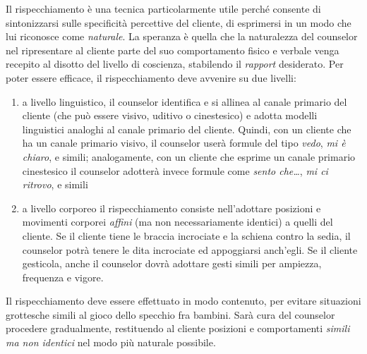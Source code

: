 \noindent Il rispecchiamento è una tecnica particolarmente utile perché consente di sintonizzarsi sulle specificità percettive del cliente, di esprimersi in un modo che lui riconosce come \textit{naturale}. La speranza è quella che la naturalezza del counselor nel ripresentare al cliente parte del suo comportamento fisico e verbale venga recepito al disotto del livello di coscienza, stabilendo il \emph{rapport} desiderato.
Per poter essere efficace, il rispecchiamento deve avvenire su due livelli:
\begin{enumerate}
\item a livello linguistico, il counselor identifica e si allinea al canale primario del cliente (che può essere visivo, uditivo o cinestesico) e adotta modelli linguistici analoghi al canale primario del cliente. Quindi, con un cliente che ha un canale primario visivo, il counselor userà formule del tipo \emph{vedo}, \emph{mi è chiaro}, e simili; analogamente, con un cliente che esprime un canale primario cinestesico il counselor adotterà invece formule come \emph{sento che\ldots}, \emph{mi ci ritrovo}, e simili
%
\item a livello corporeo il rispecchiamento consiste nell'adottare posizioni e movimenti corporei \emph{affini} (ma non necessariamente identici) a quelli del cliente. Se il cliente tiene le braccia incrociate e la schiena contro la sedia, il counselor potrà tenere le dita incrociate ed appoggiarsi anch'egli. Se il cliente gesticola, anche il counselor dovrà adottare gesti simili per ampiezza, frequenza e vigore.
\end{enumerate}

\noindent Il rispecchiamento deve essere effettuato in modo contenuto, per evitare situazioni grottesche simili al gioco dello specchio fra bambini. Sarà cura del counselor procedere gradualmente, restituendo al cliente posizioni e comportamenti \emph{simili ma non identici} nel modo più naturale possibile.
%

